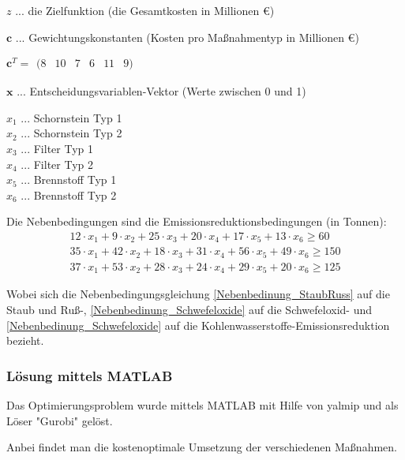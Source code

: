 \documentclass{eegreport}
\begin{document}
\begin{center}
\parbox{13cm}{
$z$ ... die Zielfunktion (die Gesamtkosten in Millionen €)

$\textbf{c}$ ... Gewichtungskonstanten (Kosten pro Maßnahmentyp in Millionen €)
\begin{center}
\parbox{9cm}{
$\textbf{c}^T = \begin{matrix}(8&10&7&6&11&9)\end{matrix}$
}
\end{center}
$\textbf{x}$ ... Entscheidungsvariablen-Vektor (Werte zwischen 0 und 1)


\begin{center}
\parbox{9cm}{
$x_1$ ... Schornstein Typ 1\\
$x_2$ ... Schornstein Typ 2\\
$x_3$ ... Filter Typ 1\\
$x_4$ ... Filter Typ 2\\
$x_5$ ... Brennstoff Typ 1\\
$x_6$ ... Brennstoff Typ 2\\
}
\end{center}
}
\end{center}

Die Nebenbedingungen sind die Emissionsreduktionsbedingungen (in Tonnen):
\begin{align}
\label{Nebenbedinung_StaubRuss}12 \cdot x_1 + 9 \cdot x_2  + 25 \cdot x_3 + 20 \cdot x_4 + 17 \cdot x_5  + 13 \cdot x_6 \geq 60\\
\label{Nebenbedinung_Schwefeloxide}35 \cdot x_1 + 42 \cdot x_2  + 18 \cdot x_3 + 31 \cdot x_4 + 56 \cdot x_5  + 49 \cdot x_6 \geq 150\\ 
\label{Nebenbedinung_Kohlenwasserstoffe}37 \cdot x_1 + 53 \cdot x_2  + 28 \cdot x_3 + 24 \cdot x_4 + 29 \cdot x_5  + 20 \cdot x_6 \geq 125
\end{align}

Wobei sich die Nebenbedingungsgleichung \ref{Nebenbedinung_StaubRuss} auf die Staub und Ruß-, \ref{Nebenbedinung_Schwefeloxide} auf die Schwefeloxid- und \ref{Nebenbedinung_Schwefeloxide} auf die Kohlenwasserstoffe-Emissionsreduktion bezieht.
\newpage
\subsubsection{Lösung mittels MATLAB}
Das Optimierungsproblem wurde mittels MATLAB mit Hilfe von yalmip und als Löser "Gurobi" gelöst.

Anbei findet man die kostenoptimale Umsetzung der verschiedenen Maßnahmen.
\end{document}
